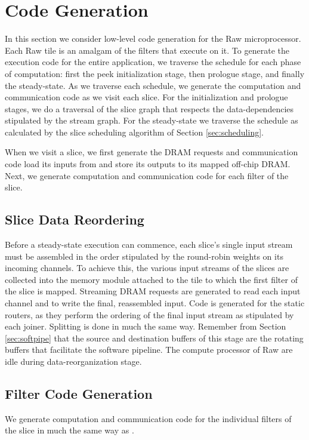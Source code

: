 \section{Code Generation}
\label{sec:codegen}
In this section we consider low-level code generation for the Raw
microprocessor. Each Raw tile is an amalgam of the filters that
execute on it. To generate the execution code for the entire
application, we traverse the schedule for each phase of computation:
first the peek initialization stage, then prologue stage, and finally
the steady-state.  As we traverse each schedule, we generate the
computation and communication code as we visit each slice.  For the
initialization and prologue stages, we do a traversal of the slice
graph that respects the data-dependencies stipulated by the stream
graph. For the steady-state we traverse the schedule as calculated by
the slice scheduling algorithm of Section \ref{sec:scheduling}.

When we visit a slice, we first generate the DRAM requests and
communication code load its inputs from and store its outputs to its
mapped off-chip DRAM.  Next, we generate computation and communication
code for each filter of the slice.  

\subsection{Slice Data Reordering}
Before a steady-state execution can commence, each slice's single
input stream must be assembled in the order stipulated by the
round-robin weights on its incoming channels. To achieve this, the
various input streams of the slices are collected into the memory
module attached to the tile to which the first filter of the slice is
mapped. Streaming DRAM requests are generated to read each input
channel and to write the final, reassembled input.  Code is generated
for the static routers, as they perform the ordering of the final
input stream as stipulated by each joiner.  Splitting is done in much
the same way.  Remember from Section \ref{sec:softpipe} that the
source and destination buffers of this stage are the rotating buffers
that facilitate the software pipeline.  The compute processor of Raw
are idle during data-reorganization stage.

\subsection{Filter Code Generation}
We generate computation and communication code for the individual
filters of the slice in much the same way as \cite{streamit-asplos}.  

